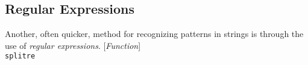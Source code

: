 \documentclass[10pt]{book}
\newenvironment{defother}[2]{[\textit{#1}]\\\texttt{#2}}{\\}
\newenvironment{defun}[1]{\begin{defother}{Function}{#1}}{\end{defother}}
\begin{document}
\subsection{Regular Expressions}
Another, often quicker, method for recognizing patterns in strings is through the use of \textit{regular expressions}.
\begin{defun}{splitre} \end{defun}
\end{document}
